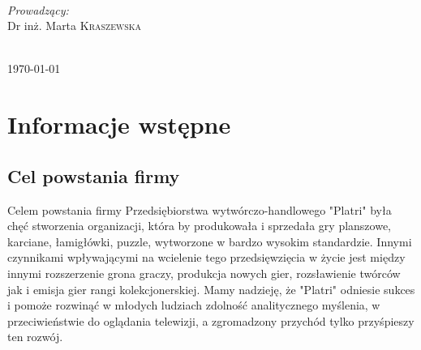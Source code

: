 \documentclass[a4paper, 11pt]{article}
\begin{document}
\begin{titlepage}
\begin{minipage}{0.4\textwidth}
\begin{flushleft}
\end{flushleft}
\end{minipage}
~
\begin{minipage}{0.4\textwidth}
\begin{flushright} \large
\emph{Prowadzący:}\\
 Dr inż. Marta \textsc{Kraszewska}  %
\end{flushright}
\end{minipage} \\[5cm]

		
		
		{\large \today}\\[3cm] %
		
		
		
		
		\vfill %
		
	\end{titlepage}
	
	
	\tableofcontents
	\vfill

	\newpage
	\section{Informacje wstępne}

	\subsection{Cel powstania firmy}
	\indent

Celem powstania firmy Przedsiębiorstwa wytwórczo-handlowego "Platri" była chęć stworzenia organizacji, która by produkowała i sprzedała gry planszowe, karciane, łamigłówki, puzzle, wytworzone w bardzo wysokim standardzie. Innymi czynnikami wpływającymi na wcielenie tego przedsięwzięcia w życie jest między innymi rozszerzenie grona graczy, produkcja nowych gier, rozsławienie twórców jak i emisja gier rangi kolekcjonerskiej. Mamy nadzieję, że "Platri" odniesie sukces i pomoże rozwinąć w młodych ludziach zdolność analitycznego myślenia, w przeciwieństwie do oglądania telewizji, a zgromadzony przychód tylko przyśpieszy ten rozwój.
\end{document}
